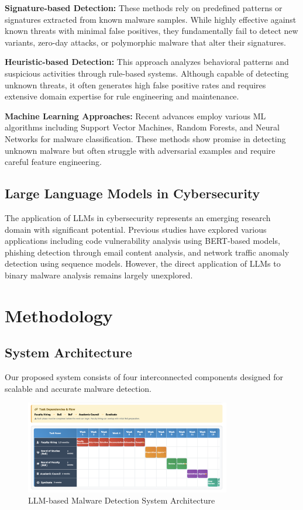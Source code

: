 \documentclass[12pt,a4paper]{article}
\begin{document}
\textbf{Signature-based Detection:} These methods rely on predefined patterns or signatures extracted from known malware samples. While highly effective against known threats with minimal false positives, they fundamentally fail to detect new variants, zero-day attacks, or polymorphic malware that alter their signatures.

\textbf{Heuristic-based Detection:} This approach analyzes behavioral patterns and suspicious activities through rule-based systems. Although capable of detecting unknown threats, it often generates high false positive rates and requires extensive domain expertise for rule engineering and maintenance.

\textbf{Machine Learning Approaches:} Recent advances employ various ML algorithms including Support Vector Machines, Random Forests, and Neural Networks for malware classification. These methods show promise in detecting unknown malware but often struggle with adversarial examples and require careful feature engineering.

\subsection{Large Language Models in Cybersecurity}

The application of LLMs in cybersecurity represents an emerging research domain
with significant potential. Previous studies have explored various applications
including code vulnerability analysis using BERT-based models, phishing
detection through email content analysis, and network traffic anomaly detection
using sequence models. However, the direct application of LLMs to binary
malware analysis remains largely unexplored.

\section{Methodology}

\subsection{System Architecture}

Our proposed system consists of four interconnected components designed for
scalable and accurate malware detection.

\begin{figure}[H]
    \centering
    \includegraphics[width=0.8\textwidth]{gain_chart.png}
    \caption{LLM-based Malware Detection System Architecture}
    \label{fig:architecture}
\end{figure}
\end{document}
